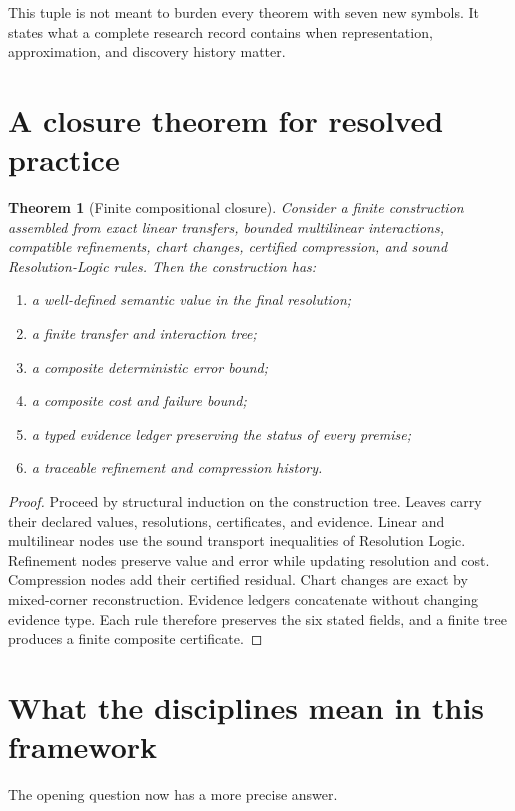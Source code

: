\documentclass[11pt,oneside]{book}
\newtheorem{theorem}[definition]{Theorem}
\theoremstyle{remark}
\begin{document}
This tuple is not meant to burden every theorem with seven new symbols.  It states what a complete research record contains when representation, approximation, and discovery history matter.

\section{A closure theorem for resolved practice}
\begin{theorem}[Finite compositional closure]
Consider a finite construction assembled from exact linear transfers, bounded multilinear interactions, compatible refinements, chart changes, certified compression, and sound Resolution-Logic rules.  Then the construction has:
\begin{enumerate}[label=\arabic*.]
\item a well-defined semantic value in the final resolution;
\item a finite transfer and interaction tree;
\item a composite deterministic error bound;
\item a composite cost and failure bound;
\item a typed evidence ledger preserving the status of every premise;
\item a traceable refinement and compression history.
\end{enumerate}
\end{theorem}

\begin{proof}
Proceed by structural induction on the construction tree.  Leaves carry their declared values, resolutions, certificates, and evidence.  Linear and multilinear nodes use the sound transport inequalities of Resolution Logic.  Refinement nodes preserve value and error while updating resolution and cost.  Compression nodes add their certified residual.  Chart changes are exact by mixed-corner reconstruction.  Evidence ledgers concatenate without changing evidence type.  Each rule therefore preserves the six stated fields, and a finite tree produces a finite composite certificate.
\end{proof}

\section{What the disciplines mean in this framework}
The opening question now has a more precise answer.
\end{document}
